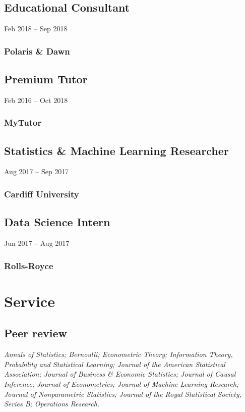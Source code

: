 \documentclass{wgu-cv}
\begin{document}
\subsection{Educational Consultant}
{Feb 2018 -- Sep 2018}
\subsubsection{Polaris \& Dawn}
\vspace{-0.20cm}

\subsection{Premium Tutor}
{Feb 2016 -- Oct 2018}
\subsubsection{MyTutor}
\vspace{-0.20cm}

\subsection{Statistics \& Machine Learning Researcher}
{Aug 2017 -- Sep 2017}
\subsubsection{Cardiff University}
\vspace{-0.20cm}

\subsection{Data Science Intern}
{Jun 2017 -- Aug 2017}
\subsubsection{Rolls-Royce}

\section{Service}

\subsection{Peer review}{}

\emph{%
  Annals of Statistics;
  Bernoulli;
  Econometric Theory;
  Information Theory, Probability and Statistical Learning;
  Journal of the American Statistical Association;
  Journal of Business \& Economic Statistics;
  Journal of Causal Inference;
  Journal of Econometrics;
  Journal of Machine Learning Research;
  Journal of Nonparametric Statistics;
  Journal of the Royal Statistical Society, Series B;
  Operations Research.
}
\end{document}
